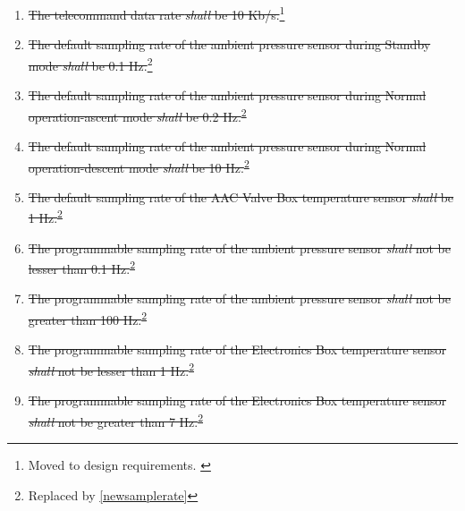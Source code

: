 \documentclass[a4paper,12pt,twoside, final]{article}
\providecommand{\DIFaddbegin}{} %
\providecommand{\DIFaddend}{} %
\providecommand{\DIFdelbegin}{} %
\providecommand{\DIFdelend}{} %
\newcommand{\DIFscaledelfig}{0.5}
\newlength{\DIFdelgraphicswidth} %
\newlength{\DIFdelgraphicsheight} %
\newcommand{\DIFaddincludegraphics}[2][]{{\color{blue}\fbox{\DIFOincludegraphics[#1]{#2}}}} %
\newcommand{\DIFdelincludegraphics}[2][]{%
\sbox{\DIFdelgraphicsbox}{\DIFOincludegraphics[#1]{#2}}%
\settoboxwidth{\DIFdelgraphicswidth}{\DIFdelgraphicsbox} %
\settoboxtotalheight{\DIFdelgraphicsheight}{\DIFdelgraphicsbox} %
\scalebox{\DIFscaledelfig}{%
\parbox[b]{\DIFdelgraphicswidth}{\usebox{\DIFdelgraphicsbox}\\[-\baselineskip] \rule{\DIFdelgraphicswidth}{0em}}\llap{\resizebox{\DIFdelgraphicswidth}{\DIFdelgraphicsheight}{%
\setlength{\unitlength}{\DIFdelgraphicswidth}%
\begin{picture}(1,1)%
\thicklines\linethickness{2pt} %
{\color[rgb]{1,0,0}\put(0,0){\framebox(1,1){}}}%
{\color[rgb]{1,0,0}\put(0,0){\line( 1,1){1}}}%
{\color[rgb]{1,0,0}\put(0,1){\line(1,-1){1}}}%
\end{picture}%
}\hspace*{3pt}}} %
} %
\DeclareRobustCommand{\DIFaddbegin}{\DIFOaddbegin \let\includegraphics\DIFaddincludegraphics} %
\DeclareRobustCommand{\DIFaddend}{\DIFOaddend \let\includegraphics\DIFOincludegraphics} %
\DeclareRobustCommand{\DIFdelbegin}{\DIFOdelbegin \let\includegraphics\DIFdelincludegraphics} %
\DeclareRobustCommand{\DIFdelend}{\DIFOaddend \let\includegraphics\DIFOincludegraphics} %
\begin{document}
\begin{enumerate}[label=P.\arabic*]
    \item \DIFdelbegin %
\DIFdelend \DIFaddbegin \st{The telecommand data rate \textit{shall} be 10 Kb/s.}\DIFaddend \footnote{Moved to design requirements.\DIFdelbegin %
\DIFdelend \DIFaddbegin \label{designRequirement}\DIFaddend }
    \item \st{The default sampling rate of the ambient pressure sensor during Standby mode \textit{shall} be 0.1 Hz.}\footnote{Replaced by \ref{newsamplerate}\label{replaceSampleRate}}
    \item \st{The default sampling rate of the ambient pressure sensor during Normal operation-ascent mode \textit{shall} be 0.2 Hz.}\textsuperscript{\ref{replaceSampleRate}}
    \item \st{The default sampling rate of the ambient pressure sensor during Normal operation-descent mode \textit{shall} be 10 Hz.}\textsuperscript{\ref{replaceSampleRate}}
    \item \st{The default sampling rate of the AAC Valve Box temperature sensor \textit{shall} be 1 Hz.}\textsuperscript{\ref{replaceSampleRate}}
    \item \st{The programmable sampling rate of the ambient pressure sensor \textit{shall} not be lesser than 0.1 Hz.}\textsuperscript{\ref{replaceSampleRate}}
    \item \st{The programmable sampling rate of the ambient pressure sensor \textit{shall} not be greater than 100 Hz.}\textsuperscript{\ref{replaceSampleRate}}
    \item \DIFdelbegin %
\DIFdelend \DIFaddbegin \st{The programmable sampling rate of the Electronics Box temperature sensor \textit{shall} not be lesser than 1 Hz.}\DIFaddend \textsuperscript{\ref{replaceSampleRate}}
    \item \DIFdelbegin %
\DIFdelend \DIFaddbegin \st{The programmable sampling rate of the Electronics Box temperature sensor \textit{shall} not be greater than 7 Hz.}\DIFaddend \textsuperscript{\ref{replaceSampleRate}}

\end{enumerate}
\end{document}
